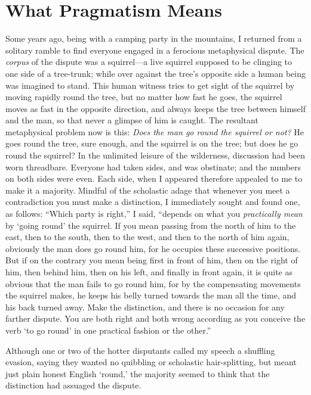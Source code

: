 
\author{William James}
\chapter[William James -- What Pragmatism Means]{What Pragmatism
Means}


Some years ago, being with a camping party in the mountains,
I returned from a solitary ramble to find everyone engaged in a
ferocious metaphysical dispute. The \textit{corpus} of the dispute was
a squir\-rel---a live squirrel supposed to be clinging to one side of a
tree-trunk; while over against the tree's opposite side a human being
was imagined to stand. This human witness tries to get sight of the
squirrel by moving rapidly round the tree, but no matter how fast he
goes, the squirrel moves as fast in the opposite direction, and always
keeps the tree between himself and the man, so that never a glimpse of
him is caught. The resultant metaphysical problem now is this:
\textit{Does the man go round the squirrel or not?} He goes round the
tree, sure enough, and the squirrel is on the tree; but does he go
round the squirrel? In the unlimited leisure of the wilderness,
discussion had been worn threadbare. Everyone had taken sides, and was
obstinate; and the numbers on  both sides were even. Each
side, when I appeared therefore appealed to me to make it a majority.
Mindful of the scholastic adage that whenever you meet a contradiction
you must make a distinction, I immediately sought and found one, as
follows: ``Which party is right,'' I said, ``depends on what you
\textit{practically mean} by `going round' the squirrel. If you mean
passing from the north of him to the east, then to the south, then
to the west, and then to the north of him again, obviously the man
does go round him, for he occupies these successive positions. But if
on the contrary you mean being first in front of him, then on the
right of him, then behind him, then on his left, and finally in front
again, it is quite as obvious that the man fails to go round him, for
by the compensating movements the squirrel makes, he keeps his belly
turned towards the man all the time, and his back turned away. Make
the distinction, and there is no occasion for any farther dispute. You
are both right and both wrong according as you conceive the verb `to
go round' in one practical fashion or the other.''

Although one or two of the hotter disputants called my speech
a shuffling evasion, saying they wanted no quibbling or scholastic
hair-splitting, but meant just plain honest English `round,' the
majority seemed to think that the distinction had assuaged the
dispute.

